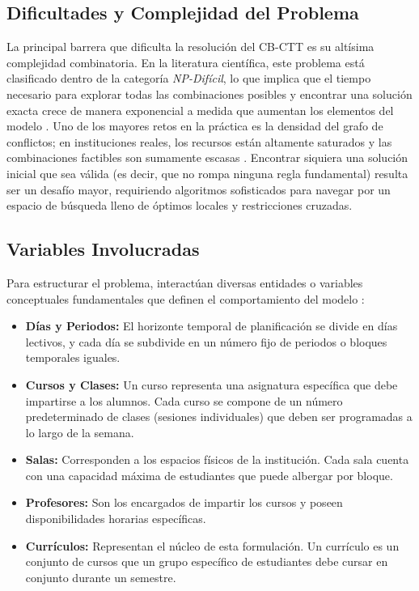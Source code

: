 \documentclass[letter, 10pt]{article}
\begin{document}
\subsection*{Dificultades y Complejidad del Problema}
La principal barrera que dificulta la resolución del CB-CTT es su altísima complejidad combinatoria. En la literatura científica, este problema está clasificado dentro de la categoría \textit{NP-Difícil}, lo que implica que el tiempo necesario para explorar todas las combinaciones posibles y encontrar una solución exacta crece de manera exponencial a medida que aumentan los elementos del modelo \cite{schaerf1999}. Uno de los mayores retos en la práctica es la densidad del grafo de conflictos; en instituciones reales, los recursos están altamente saturados y las combinaciones factibles son sumamente escasas \cite{ceschia2023}. Encontrar siquiera una solución inicial que sea válida (es decir, que no rompa ninguna regla fundamental) resulta ser un desafío mayor, requiriendo algoritmos sofisticados para navegar por un espacio de búsqueda lleno de óptimos locales y restricciones cruzadas.

\subsection*{Variables Involucradas}
Para estructurar el problema, interactúan diversas entidades o variables conceptuales fundamentales que definen el comportamiento del modelo \cite{decesco2008}:
\begin{itemize}
    \item \textbf{Días y Periodos:} El horizonte temporal de planificación se divide en días lectivos, y cada día se subdivide en un número fijo de periodos o bloques temporales iguales.
    \item \textbf{Cursos y Clases:} Un curso representa una asignatura específica que debe impartirse a los alumnos. Cada curso se compone de un número predeterminado de clases (sesiones individuales) que deben ser programadas a lo largo de la semana.
    \item \textbf{Salas:} Corresponden a los espacios físicos de la institución. Cada sala cuenta con una capacidad máxima de estudiantes que puede albergar por bloque.
    \item \textbf{Profesores:} Son los encargados de impartir los cursos y poseen disponibilidades horarias específicas.
    \item \textbf{Currículos:} Representan el núcleo de esta formulación. Un currículo es un conjunto de cursos que un grupo específico de estudiantes debe cursar en conjunto durante un semestre.
\end{itemize}
\end{document}
